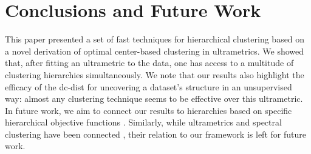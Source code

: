 \section{Conclusions and Future Work}

This paper presented a set of fast techniques for hierarchical clustering based on a novel derivation of optimal center-based clustering in ultrametrics. We showed that, after fitting an ultrametric to the data, one has access to a multitude of clustering hierarchies simultaneously. We note that our results also highlight the efficacy of the dc-dist for uncovering a dataset's structure in an unsupervised way: almost any clustering technique seems to be effective over this ultrametric. 
In future work, we aim to connect our results to hierarchies based on
specific hierarchical objective functions \citep{dasgupta_objective, Cohen_hierarchical_2019}. 
Similarly, while ultrametrics and spectral clustering have been connected \citep{pathbasedSC, beer2023connecting}, their relation to our framework is left for future work.
